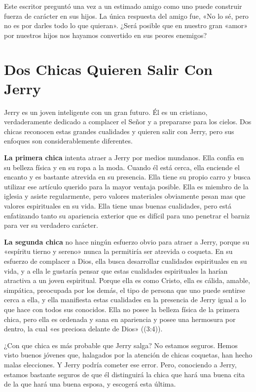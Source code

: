\documentclass[12pt, twoside, openright]{book}
\begin{document}
Este escritor preguntó una vez a un estimado amigo como uno puede construir fuerza de carácter en sus hijos. La única respuesta del amigo fue, «No lo sé, pero no es por darles todo lo que quieran». ¿Será posible que en nuestro gran «amor» por nuestros hijos nos hayamos convertido en sus peores enemigos?

\section{Dos Chicas Quieren Salir Con Jerry}
Jerry es un joven inteligente con un gran futuro. Él es un cristiano, verdaderamente dedicado a complacer el Señor y a prepararse para los cielos. Dos chicas reconocen estas grandes cualidades y quieren salir con Jerry, pero sus enfoques son considerablemente diferentes. 

\textbf{La primera chica} intenta atraer a Jerry por medios mundanos. Ella confía en su belleza física y en su ropa a la moda. Cuando él está cerca, ella enciende el encanto y es bastante atrevida en su presencia. Ella tiene su propio carro y busca utilizar ese artículo querido para la mayor ventaja posible. Ella es miembro de la iglesia y asiste regularmente, pero valores materiales obviamente pesan mas que valores espirituales en su vida. Ella tiene unas buenas cualidades, pero está enfatizando tanto su apariencia exterior que es difícil para uno penetrar el barniz para ver su verdadero carácter. 

\textbf{La segunda chica} no hace ningún esfuerzo obvio para atraer a Jerry, porque su «espíritu tierno y sereno» nunca la permitiría ser atrevida o coqueta. En su esfuerzo de complacer a Dios, ella busca desarrollar cualidades espirituales en su vida, y a ella le gustaría pensar que estas cualidades espirituales la harían atractiva a un joven espiritual. Porque ella es como Cristo, ella es cálida, amable, simpática, preocupada por los demás, el tipo de persona que uno puede sentirse cerca a ella, y ella manifiesta estas cualidades en la presencia de Jerry igual a lo que hace con todos sus conocidos. Ella no posee la belleza física de la primera chica, pero ella es ordenada y sana en apariencia y posee una hermosura por dentro, la cual «es preciosa delante de Dios» ((3:4)). 

¿Con que chica es más probable que Jerry salga? No estamos seguros. Hemos visto buenos jóvenes que, halagados por la atención de chicas coquetas, han hecho malas elecciones. Y Jerry podría cometer ese error. Pero, conociendo a Jerry, estamos bastante seguros de que él distinguirá la chica que hará una buena cita de la que hará una buena esposa, y escogerá esta última. 
\end{document}
